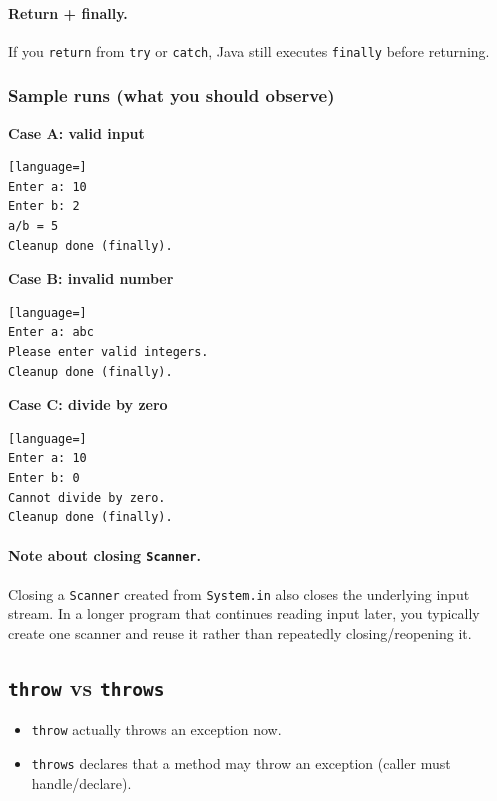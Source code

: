 \documentclass[11pt]{article}
\begin{document}
\paragraph{Return + finally.}
If you \texttt{return} from \texttt{try} or \texttt{catch}, Java still executes \texttt{finally} before returning.

\subsubsection*{Sample runs (what you should observe)}
\textbf{Case A: valid input}
\begin{lstlisting}[language=]
Enter a: 10
Enter b: 2
a/b = 5
Cleanup done (finally).
\end{lstlisting}

\textbf{Case B: invalid number}
\begin{lstlisting}[language=]
Enter a: abc
Please enter valid integers.
Cleanup done (finally).
\end{lstlisting}

\textbf{Case C: divide by zero}
\begin{lstlisting}[language=]
Enter a: 10
Enter b: 0
Cannot divide by zero.
Cleanup done (finally).
\end{lstlisting}

\paragraph{Note about closing \texttt{Scanner}.}
Closing a \texttt{Scanner} created from \texttt{System.in} also closes the underlying input stream.
In a longer program that continues reading input later, you typically create one scanner and reuse it rather than repeatedly closing/reopening it.

\subsection{\texttt{throw} vs \texttt{throws}}
\begin{itemize}
  \item \texttt{throw} actually throws an exception now.
  \item \texttt{throws} declares that a method may throw an exception (caller must handle/declare).
\end{itemize}
\end{document}
